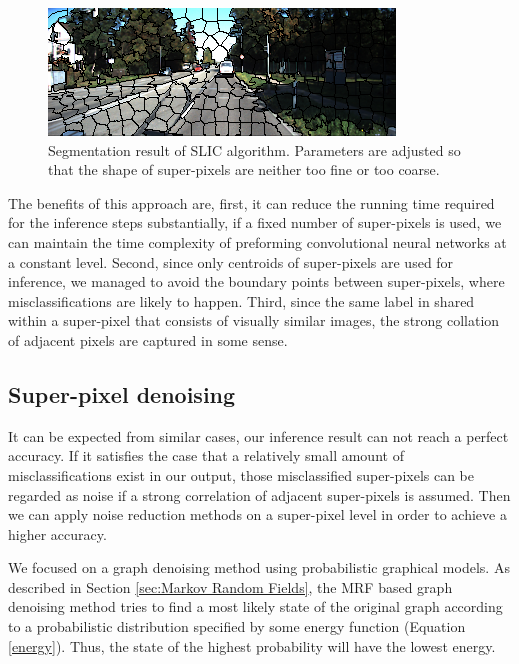 \begin{figure}[h!]
\centering
\includegraphics[width=0.7\linewidth]{pics/slic.png}
\caption{Segmentation result of SLIC algorithm. Parameters are adjusted so that the shape of super-pixels are neither too fine or too coarse.}
\label{genfig}
\end{figure}

The benefits of this approach are, first, it can reduce the running time required for the inference steps substantially, if a fixed number of super-pixels is used, we can maintain the time complexity of preforming convolutional neural networks at a constant level. Second, since only centroids of super-pixels are used for inference, we managed to avoid the boundary points between super-pixels, where misclassifications are likely to happen. Third, since the same label in shared within a super-pixel that consists of visually similar images, the strong collation of adjacent pixels are captured in some sense.

\subsection{Super-pixel denoising}
\label{sec:Super-pixel denoising}
It can be expected from similar cases, our inference result can not reach a perfect accuracy. If it satisfies the case that a relatively small amount of misclassifications exist in our output, those misclassified super-pixels can be regarded as noise if a strong correlation of adjacent super-pixels is assumed. Then we can apply noise reduction methods on a super-pixel level in order to achieve a higher accuracy.

We focused on a graph denoising method using probabilistic graphical models. As described in Section \ref{sec:Markov Random Fields}, the MRF based graph denoising method tries to find a most likely state of the original graph according to a probabilistic distribution specified by some energy function (Equation \ref{energy}). Thus, the state of the highest probability will have the lowest energy.

